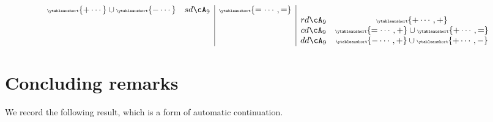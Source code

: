 \documentclass[12pt,a4paper]{amsart}
\numberwithin{equation}{section}
\theoremstyle{remark}
\let\ytb=\ytableaushort
\newcommand{\tytb}[1]{{\tiny\ytb{#1}}}
\begin{document}
{\begin{equation}
\begin{array}{cc|c|cc}
                                                            \tytb{+\cdots} \cup\tytb{-\cdots}    & sd\cA_{9} & \tytb{=\cdots,=}                 \\
                        &                    &                & rd\cA_{9} &\tytb{+\cdots,+}                                   \\
                        &                    &                & cd\cA_{9} &\tytb{=\cdots,+}  \cup \tytb{+\cdots,=}                \\
                        &                    &                & dd\cA_{9} &\tytb{-\cdots,+} \cup \tytb{+\cdots,-}                       \\
\end{array}
\end{equation}
}



\section{Concluding remarks} We record the following result, which is a form of automatic continuation.
\end{document}

